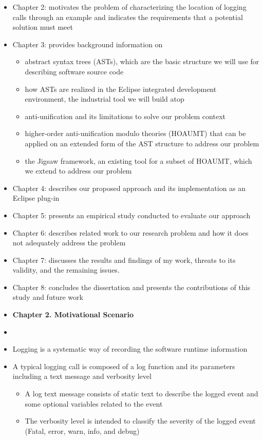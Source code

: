 \documentclass{article}
\newcommand{\bold}{\textbf}
\begin{document}
\begin{itemize} [leftmargin=.1in]
\item Chapter 2: motivates the problem of characterizing the location of logging calls through an example and indicates the requirements that a potential solution must meet
\item Chapter 3: provides background information on 
\begin{itemize}
\item abstract syntax trees (ASTs), which are the basic structure we will use for describing software source code
\item how ASTs are realized in the Eclipse integrated development environment, the industrial tool we will build atop
\item anti-unification and its limitations to solve our problem context
\item higher-order anti-unification modulo theories (HOAUMT) that can be applied on an extended form of the AST structure to address our problem
\item the Jigsaw framework, an existing tool for a subset of HOAUMT, which we extend to address our problem
\end{itemize}
\item Chapter 4: describes our proposed approach and its implementation as an Eclipse plug-in
\item Chapter 5: presents an empirical study conducted to evaluate our approach
\item Chapter 6: describes related work to our research problem and how it
does not adequately address the problem
\item Chapter 7: discusses the results and findings of my work, threats to its validity, and the remaining issues.
\item Chapter 8: concludes the dissertation and presents the contributions of this study and future work

\item \bold{Chapter 2. Motivational Scenario}

\item {}
\item Logging is a systematic way of recording the software runtime information
\item A typical logging call is composed of a log function and its parameters including a text message and verbosity level
\begin{itemize}
\item A log text message consists of static text to describe the logged event
and some optional variables related to the event
\item The verbosity level is intended to classify the
severity of the logged event (Fatal, error, warn, info, and debug)
\end{itemize}


\end{itemize}
\end{document}
